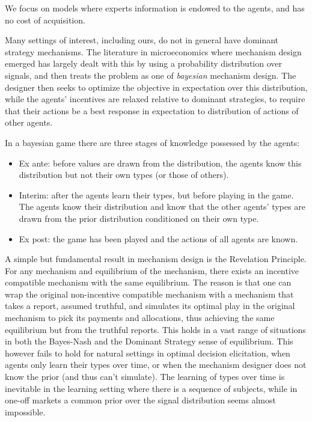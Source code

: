 We focus on models where experts information is endowed to the agents, and has no cost of acquisition.

Many settings of interest, including ours, do not in general have dominant strategy mechanisms. 
The literature in microeconomics where mechanism design emerged has largely dealt with this by using a probability distribution over signals, and then treats the problem as one of \emph{bayesian} mechanism design.
The designer then seeks to optimize the objective in expectation over this distribution, while the agents' incentives are relaxed relative to dominant strategies, to require that their actions be a best response in expectation to distribution of actions of other agents.

In a bayesian game there are three stages of knowledge possessed by the agents:
\begin{itemize}
 \item Ex ante: before values are drawn from the distribution, the agents know this distribution but not their own types (or those of others). 
 \item Interim: after the agents learn their types, but before playing in the game. The agents know their distribution and know that the other agents' types are drawn from the prior distribution conditioned on their own type.
 \item Ex post: the game has been played and the actions of all agents are known.
\end{itemize}

A simple but fundamental result in mechanism design is the Revelation Principle.
For any mechanism and equilibrium of the mechanism, there exists an incentive compatible mechanism with the same equilibrium.
The reason is that one can wrap the original non-incentive compatible mechanism with a mechanism that takes a report, assumed truthful, and simulates its optimal play in the original mechanism to pick its payments and allocations, thus achieving the same equilibrium but from the truthful reports. 
This holds in a vast range of situations in both the Bayes-Nash and the Dominant Strategy sense of equilibrium. 
This however fails to hold for natural settings in optimal decision elicitation, when agents only learn their types over time, or when the mechanism designer does not know the prior (and thus can't simulate).
The learning of types over time is inevitable in the learning setting where there is a sequence of subjects, while in one-off markets a common prior over the signal distribution seems almost impossible.



